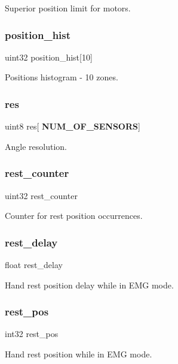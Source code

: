 Superior position limit for motors. \mbox{\label{structst__mem_ab6a7872da6e5008df9709e4d0a57b7ab}} 
\subsubsection{position\+\_\+hist}
{\footnotesize\ttfamily uint32 position\+\_\+hist[10]}

Positions histogram -\/ 10 zones. \mbox{\label{structst__mem_ac2e19d167eac4c8ca9ce97c646e78595}} 
\subsubsection{res}
{\footnotesize\ttfamily uint8 res[\textbf{ N\+U\+M\+\_\+\+O\+F\+\_\+\+S\+E\+N\+S\+O\+RS}]}

Angle resolution. \mbox{\label{structst__mem_ac3b4a645a1b680f6f03e6efdf9d7a2df}} 
\subsubsection{rest\+\_\+counter}
{\footnotesize\ttfamily uint32 rest\+\_\+counter}

Counter for rest position occurrences. \mbox{\label{structst__mem_a5d9f92583ac10c78cbb3c0da7a373f6a}} 
\subsubsection{rest\+\_\+delay}
{\footnotesize\ttfamily float rest\+\_\+delay}

Hand rest position delay while in E\+MG mode. \mbox{\label{structst__mem_a27742da1d6ad36d8051848f9e4346146}} 
\subsubsection{rest\+\_\+pos}
{\footnotesize\ttfamily int32 rest\+\_\+pos}

Hand rest position while in E\+MG mode. \mbox{\label{structst__mem_a8a4aa5efee4b9d62ea71a1459cf3ac3b}} 
